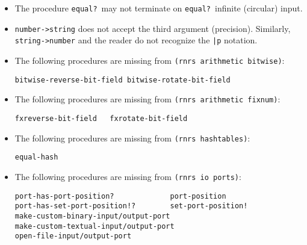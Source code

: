 \documentclass[onecolumn, 12pt, twoside, openright, dvipdfm]{book}
\begin{document}
\begin{itemize}
\item The procedure \texttt{equal?}\ may not terminate on
\texttt{equal?}\ infinite (circular) input.
\item \texttt{number->string} does not accept the third argument
(precision).  Similarly, \texttt{string->number} and the reader do
not recognize the \texttt{|p} notation. 


\item The following procedures are missing from \texttt{(rnrs arithmetic
bitwise)}:
\begin{Verbatim}
bitwise-reverse-bit-field bitwise-rotate-bit-field 
\end{Verbatim}

\item The following procedures are missing from \texttt{(rnrs arithmetic
fixnum)}:
\begin{Verbatim}
fxreverse-bit-field   fxrotate-bit-field   
\end{Verbatim}


\item The following procedures are missing from \texttt{(rnrs hashtables)}:
\begin{Verbatim}
equal-hash
\end{Verbatim}

\item The following procedures are missing from \texttt{(rnrs io ports)}:
\begin{Verbatim}
port-has-port-position?             port-position
port-has-set-port-position!?        set-port-position!
make-custom-binary-input/output-port    
make-custom-textual-input/output-port 
open-file-input/output-port
\end{Verbatim}

\end{itemize}



\nocite{ghuloum-implicit}
\nocite{ghuloum-generation}

\newpage
\backmatter
\appendix
{}


\newpage
{}
{}
\printindex
\end{document}
